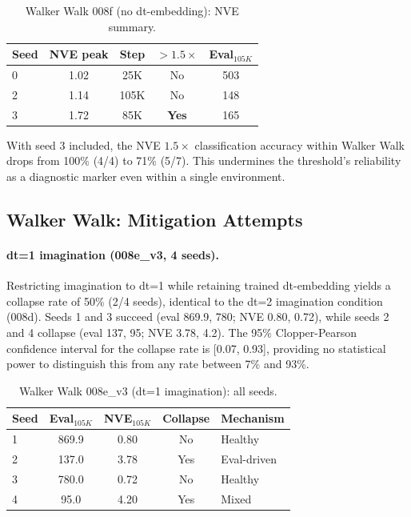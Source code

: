 \documentclass[10pt,twocolumn]{article}
\begin{document}
\begin{table}[h]
\centering
\caption{Walker Walk 008f (no dt-embedding): NVE summary.}
\label{tab:008f}
\begin{tabular}{lcccc}
\toprule
Seed & NVE peak & Step & $>1.5\times$ & Eval$_{105K}$ \\
\midrule
0 & 1.02 & 25K & No & 503 \\
2 & 1.14 & 105K & No & 148 \\
3 & 1.72 & 85K & \textbf{Yes} & 165 \\
\bottomrule
\end{tabular}
\end{table}

With seed 3 included, the NVE $1.5\times$ classification accuracy within Walker Walk drops from 100\% (4/4) to 71\% (5/7). This undermines the threshold's reliability as a diagnostic marker even within a single environment.

\subsection{Walker Walk: Mitigation Attempts}
\label{sec:walker-mitigation}

\paragraph{dt=1 imagination (008e\_v3, 4 seeds).}
Restricting imagination to dt=1 while retaining trained dt-embedding yields a collapse rate of 50\% (2/4 seeds), identical to the dt=2 imagination condition (008d). Seeds 1 and 3 succeed (eval 869.9, 780; NVE 0.80, 0.72), while seeds 2 and 4 collapse (eval 137, 95; NVE 3.78, 4.2). The 95\% Clopper-Pearson confidence interval for the collapse rate is [0.07, 0.93], providing no statistical power to distinguish this from any rate between 7\% and 93\%.

\begin{table}[h]
\centering
\caption{Walker Walk 008e\_v3 (dt=1 imagination): all seeds.}
\label{tab:008e_v3}
\begin{tabular}{lcccl}
\toprule
Seed & Eval$_{105K}$ & NVE$_{105K}$ & Collapse & Mechanism \\
\midrule
1 & 869.9 & 0.80 & No & Healthy \\
2 & 137.0 & 3.78 & Yes & Eval-driven \\
3 & 780.0 & 0.72 & No & Healthy \\
4 & 95.0 & 4.20 & Yes & Mixed \\
\bottomrule
\end{tabular}
\end{table}
\end{document}
